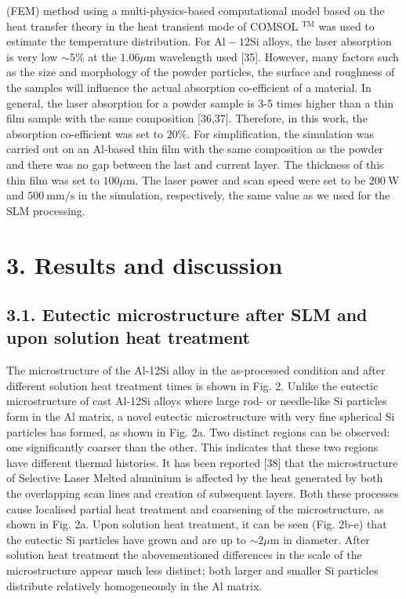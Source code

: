 \documentclass[10pt]{article}
\begin{document}
(FEM) method using a multi-physics-based computational model based on the heat transfer theory in the heat transient mode of COMSOL $^{\mathrm{TM}}$ was used to estimate the temperature distribution. For $\mathrm{Al}-12 \mathrm{Si}$ alloys, the laser absorption is very low $\sim 5 \%$ at the $1.06 \mu \mathrm{m}$ wavelength used [35]. However, many factors such as the size and morphology of the powder particles, the surface and roughness of the samples will influence the actual absorption co-efficient of a material. In general, the laser absorption for a powder sample is 3-5 times higher than a thin film sample with the same composition [36,37]. Therefore, in this work, the absorption co-efficient was set to $20 \%$. For simplification, the simulation was carried out on an Al-based thin film with the same composition as the powder and there was no gap between the last and current layer. The thickness of this thin film was set to $100 \mu \mathrm{m}$. The laser power and scan speed were set to be $200 \mathrm{~W}$ and $500 \mathrm{~mm} / \mathrm{s}$ in the simulation, respectively, the same value as we used for the SLM processing.

\section*{3. Results and discussion}
\subsection*{3.1. Eutectic microstructure after SLM and upon solution heat treatment}
The microstructure of the Al-12Si alloy in the as-processed condition and after different solution heat treatment times is shown in Fig. 2. Unlike the eutectic microstructure of cast Al-12Si alloys where large rod- or needle-like Si particles form in the Al matrix, a novel eutectic microstructure with very fine spherical Si particles has formed, as shown in Fig. 2a. Two distinct regions can be observed: one significantly coarser than the other. This indicates that these two regions have different thermal histories. It has been reported [38] that the microstructure of Selective Laser Melted aluminium is affected by the heat generated by both the overlapping scan lines and creation of subsequent layers. Both these processes cause localised partial heat treatment and coarsening of the microstructure, as shown in Fig. 2a. Upon solution heat treatment, it can be seen (Fig. 2b-e) that the eutectic Si particles have grown and are up to $\sim 2 \mu \mathrm{m}$ in diameter. After solution heat treatment the abovementioned differences in the scale of the microstructure appear much less distinct; both larger and smaller Si particles distribute relatively homogeneously in the $\mathrm{Al}$ matrix.
\end{document}
